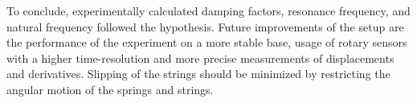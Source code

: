 To conclude, experimentally calculated damping factors, resonance frequency, and natural frequency followed the hypothesis. Future improvements of the setup are the performance of the experiment on a more stable base, usage of rotary sensors with a higher time-resolution and more precise measurements of displacements and derivatives. Slipping of the strings should be minimized by restricting the angular motion of the springs and strings.
